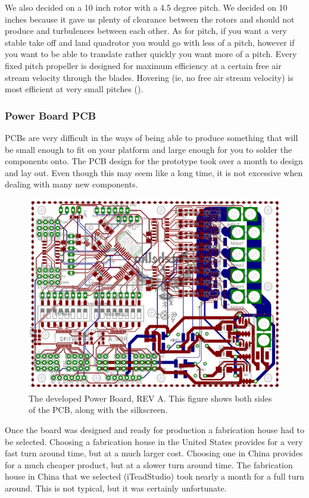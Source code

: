 \documentclass{article}
\numberwithin{equation}{section} %
\begin{document}
We also decided on a 10 inch rotor with a 4.5 degree pitch. We decided on 10 inches because it gave us plenty of clearance between the rotors and should not produce and turbulences between each other. As for pitch, if you want a very stable take off and land quadrotor you would go with less of a pitch, however if you want to be able to translate rather quickly you want more of a pitch. Every fixed pitch propeller is designed for maximum efficiency at a certain free air stream velocity through the blades. Hovering (ie, no free air stream velocity) is most efficient at very small pitches (\cite{propeller_pitch}).


\subsubsection{Power Board PCB}

PCBs are very difficult in the ways of being able to produce something that will be small enough to fit on your platform and large enough for you to solder the components onto. The PCB design for the prototype took over a month to design and lay out. Even though this may seem like a long time, it is not excessive when dealing with many new components.
\begin{figure}[h!]
  \centering
	\includegraphics[scale=.23]{revA_both.png}
  \caption{The developed Power Board, REV A. This figure shows both sides of the PCB, along with the silkscreen.}
\end{figure}  
Once the board was designed and ready for production a fabrication house had to be selected. Choosing a fabrication house in the United States provides for a very fast turn around time, but at a much larger cost. Choosing one in China provides for a much cheaper product, but at a slower turn around time. The fabrication house in China that we selected (iTeadStudio) took nearly a month for a full turn around. This is not typical, but it was certainly unfortunate.
\end{document}
